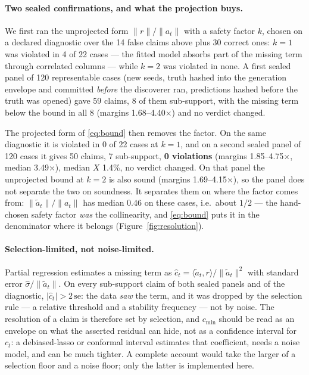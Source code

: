 \documentclass[11pt]{article}
\begin{document}
\paragraph{Two sealed confirmations, and what the projection buys.} We first ran the
unprojected form $\|r\|/\|a_t\|$ with a safety factor $k$, chosen on a declared diagnostic over
the 14 false claims above plus 30 correct ones: $k = 1$ was violated in
4 of 22 cases --- the fitted model absorbs part of the missing term through
correlated columns --- while $k = 2$ was violated in none. A first sealed panel of 120
representable cases (new seeds, truth hashed into the generation envelope and committed
\emph{before} the discoverer ran, predictions hashed before the truth was opened) gave
59 claims, 8 of them sub-support, with the missing term below
the bound in all 8 (margins 1.68--4.40$\times$)
and no verdict changed.

The projected form of \eqref{eq:bound} then removes the factor. On the same diagnostic it is
violated in 0 of 22 cases at $k = 1$, and on a second sealed panel of 120 cases
it gives 50 claims, 7 sub-support, \textbf{0 violations}
(margins 1.85--4.75$\times$, median 3.49$\times$),
median $X$ 1.4\%, no verdict changed. On that panel the unprojected
bound at $k = 2$ is also sound (margins 1.69--4.15$\times$), so the panel
does not separate the two on soundness. It separates them on where the factor comes from:
$\|\tilde a_t\| / \|a_t\|$ has median 0.46 on these cases, i.e.\ about
$1/2$ --- the hand-chosen safety factor \emph{was} the collinearity, and
\eqref{eq:bound} puts it in the denominator where it belongs (Figure~\ref{fig:resolution}).

\paragraph{Selection-limited, not noise-limited.} Partial regression estimates a missing
term as $\hat c_t = \langle \tilde a_t, r\rangle / \|\tilde a_t\|^2$ with standard error
$\hat\sigma / \|\tilde a_t\|$. On every sub-support claim of both sealed panels and of the
diagnostic, $|\hat c_t| > 2\,\mathrm{se}$: the data \emph{saw} the term, and it was dropped
by the selection rule --- a relative threshold and a stability frequency --- not by noise. The
resolution of a claim is therefore set by selection, and $c_{\min}$ should be read as an
envelope on what the asserted residual can hide, not as a confidence interval for $c_t$: a
debiased-lasso or conformal interval estimates that coefficient, needs a noise model, and can be
much tighter. A complete account would take the larger of a selection floor and a noise floor;
only the latter is implemented here.
\end{document}
